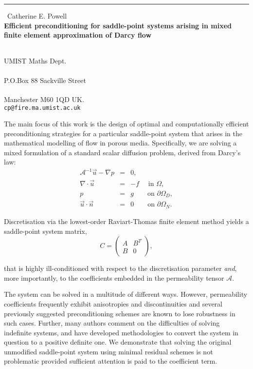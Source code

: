 \documentclass{report}
\begin{document}
\begin{center}
\rule{6in}{1pt} \
{\large Catherine E. Powell \\
{\bf Efficient preconditioning for saddle-point systems arising in mixed finite element approximation of Darcy flow}}

 \\ UMIST Maths Dept. \\  \\ P.O.Box 88 Sackville Street \\ \\ Manchester M60 1QD UK.
\\
{\tt cp@fire.ma.umist.ac.uk}\end{center}

The main focus of this work is the design of optimal and
computationally efficient preconditioning strategies for a particular
saddle-point system that arises in the mathematical modelling of flow in
porous media. Specifically, we are solving a mixed formulation of a
standard scalar diffusion problem, derived from Darcy's law:
\begin{equation}
\nonumber
\begin{array}{rcl}
\mathcal{A}^{-1}\vec {u}-\nabla p &= & 0,\\
\nabla \cdot \vec {u} &=& -f \quad \, \, \mbox{in } \Omega,\\
p &=& g
\quad\quad \mbox{on } \partial\Omega_{D},\\
\vec {u}\cdot\vec {n} &=& 0
\quad\quad \mbox{on } \partial\Omega_{N}.
\end{array}
\end{equation}

\noindent
Discretisation via the lowest-order Raviart-Thomas finite
element method yields a saddle-point system matrix,
$$ C = \left(\begin{array}{cc} A & B^{T} \\ B & 0
\end{array}\right),$$

\noindent that is highly ill-conditioned with respect to the
discretisation parameter \textit{and}, more importantly, to the
coefficients embedded in the permeability tensor $\mathcal{A}.$

The system can be solved in a multitude of different ways. However,
permeability coefficients frequently exhibit anisotropies and
discontinuities and several previously suggested preconditioning schemes
are known to lose robustness in such cases. Further, many authors comment
on the difficulties of solving indefinite systems, and have developed
methodologies to convert the system in question to a positive definite
one. We demonstrate that solving the original unmodified saddle-point
system using minimal residual schemes is not problematic provided
sufficient attention is paid to the coefficient term.
\end{document}
